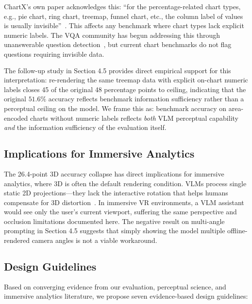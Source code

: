 \documentclass[sigconf, 10pt]{acmart}
\begin{document}
ChartX's own paper acknowledges this: ``for the percentage-related chart types, e.g., pie chart, ring chart, treemap, funnel chart, etc., the column label of values is usually invisible''~\cite{chartx}. This affects any benchmark where chart types lack explicit numeric labels. The VQA community has begun addressing this through unanswerable question detection~\cite{chartqapro}, but current chart benchmarks do not flag questions requiring invisible data.

The follow-up study in Section 4.5 provides direct empirical support for this interpretation: re-rendering the same treemap data with explicit on-chart numeric labels closes 45 of the original 48 percentage points to ceiling, indicating that the original $51.6\%$ accuracy reflects benchmark information sufficiency rather than a perceptual ceiling on the model. We frame this as: benchmark accuracy on area-encoded charts without numeric labels reflects \textit{both} VLM perceptual capability \textit{and} the information sufficiency of the evaluation itself.

\subsection{Implications for Immersive Analytics}
The 26.4-point 3D accuracy collapse has direct implications for immersive analytics, where 3D is often the default rendering condition. VLMs process single static 2D projections---they lack the interactive rotation that helps humans compensate for 3D distortion~\cite{zacks1998}. In immersive VR environments, a VLM assistant would see only the user's current viewport, suffering the same perspective and occlusion limitations documented here. The negative result on multi-angle prompting in Section 4.5 suggests that simply showing the model multiple offline-rendered camera angles is not a viable workaround.

\subsection{Design Guidelines}
Based on converging evidence from our evaluation, perceptual science, and immersive analytics literature, we propose seven evidence-based design guidelines:
\end{document}
